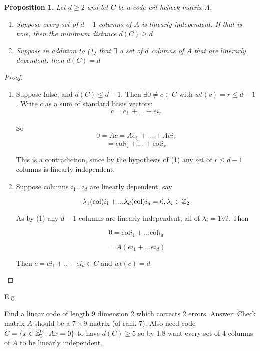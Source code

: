 \documentclass[]{article}
\newtheorem{prop}[thm]{Proposition}
\theoremstyle{definition}
\theoremstyle{remark}
\numberwithin{equation}{section}
\begin{document}
		\begin{prop}
		Let $d \geq 2$ and let $C$ be a code wit hcheck matrix $A$. 
		\begin{enumerate}
			\item\par Suppose every set of $d-1$ columns of $A$ is linearly independent. If that is true, then the minimum distance $d(C) \geq d$
			\item\par Suppose in addition to (1) that $\exists$ a set of $d$ columns of $A$ that are linerarly dependent. then $d(C) = d$
		\end{enumerate}
		\end{prop}

		\begin{proof}
		\begin{enumerate}
			\item\par Suppose false, and $d(C) \leq d-1$. Then $\exists 0 \neq c \in C$ with $wt(c) = r \leq d-1$. Write $c$ as a sum of standard basis vectors: 
			\[
				c = e_{i_1} + ... + e{i_r}
			\]

			So \[
				0 = Ac = Ae_{i_1} + ... + Ae{i_r} 
			\]
			\[
				= \text{col}i_1 + ... + \text{col}i_r
			\]

			This is a contradiction, since by the hypothesis of (1) any set of $r \leq d-1$ columns is linearly independent.

			\item\par 
			Suppose columns $i_1 ... i_d$ are linearly dependent, say

			\[
				\lambda_1 (\text{col})i_1 + ... \lambda_d(\text{col})i_d = 0, \lambda_i \in \mathbb{Z}_2
			\]

			As by (1) any $d-1$ columns are linearly independent, all of $\lambda_i = 1 \forall i$. Then 

			\[
				0 = \text{col}i_1 + ... \text{col}i_d
			\]

			\[
				= A(e{i_1} + ... e{i_d})
			\]

			Then $c = e{i_1} + .. + e{i_d} \in C$ and $wt(c) = d$
		\end{enumerate}
		\end{proof}

		E.g

			Find a linear code of length 9 dimension 2 which corrects 2 errors.
			Answer:
			Check matrix $A$ should be a $7 \times 9$ matrix (of rank 7). 
			Also need code $C = \{x \in \mathbb{Z}_2^9: Ax = 0\}$ to have $d(C)\geq 5$ so by 1.8 want every set of 4 columns of $A$ to be linearly independent.
\end{document}
